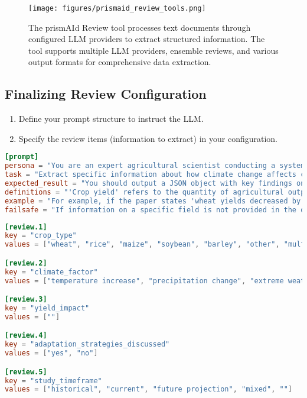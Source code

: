 \begin{figure}[h]
    \centering
    \texttt{[image: figures/prismaid\_review\_tools.png]}
    \caption{The prismAId Review tool processes text documents through configured LLM providers to extract structured information. The tool supports multiple LLM providers, ensemble reviews, and various output formats for comprehensive data extraction.}
    \label{fig:review_tools}
\end{figure}

\subsection{Finalizing Review Configuration}
\begin{enumerate}
    \item Define your prompt structure to instruct the LLM.
    \item Specify the review items (information to extract) in your configuration.
\end{enumerate}

\begin{configbox}
\begin{lstlisting}[language=TOML]
[prompt]
persona = "You are an expert agricultural scientist conducting a systematic review on climate change impacts."
task = "Extract specific information about how climate change affects crop yields from the scientific paper text provided."
expected_result = "You should output a JSON object with key findings on crop types, climate factors, and measured impacts."
definitions = "'Crop yield' refers to the quantity of agricultural output harvested per unit of land area."
example = "For example, if the paper states 'wheat yields decreased by 5.2% per degree Celsius increase', report 'wheat' as crop_type, 'temperature increase' as climate_factor, and '-5.2% per °C' as yield_impact."
failsafe = "If information on a specific field is not provided in the document, respond with an empty string value."
\end{lstlisting}
\end{configbox}

\begin{configbox}
\begin{lstlisting}[language=TOML]
[review.1]
key = "crop_type"
values = ["wheat", "rice", "maize", "soybean", "barley", "other", "multiple", ""]

[review.2]
key = "climate_factor"
values = ["temperature increase", "precipitation change", "extreme weather", "CO2 levels", "multiple factors", "other", ""]

[review.3]
key = "yield_impact"
values = [""]

[review.4]
key = "adaptation_strategies_discussed"
values = ["yes", "no"]

[review.5]
key = "study_timeframe"
values = ["historical", "current", "future projection", "mixed", ""]
\end{lstlisting}
\end{configbox}

